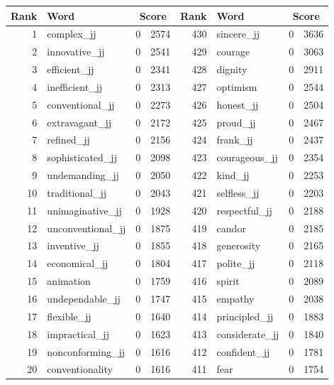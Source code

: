 \begin{table}[tbp]
    \begin{tabular}{| rlr@{.}l | rlr@{.}l |}
    \hline
    \textbf{Rank} & \textbf{Word} & \multicolumn{2}{c|}{\textbf{Score}} & \textbf{Rank} & \textbf{Word} & \multicolumn{2}{c|}{\textbf{Score}} \\
    \hline
    1 & complex\_jj & 0 & 2574    &    430 & sincere\_jj & 0 & 3636 \\
    2 & innovative\_jj & 0 & 2541    &    429 & courage & 0 & 3063 \\
    3 & efficient\_jj & 0 & 2341    &    428 & dignity & 0 & 2911 \\
    4 & inefficient\_jj & 0 & 2313    &    427 & optimism & 0 & 2544 \\
    5 & conventional\_jj & 0 & 2273    &    426 & honest\_jj & 0 & 2504 \\
    6 & extravagant\_jj & 0 & 2172    &    425 & proud\_jj & 0 & 2467 \\
    7 & refined\_jj & 0 & 2156    &    424 & frank\_jj & 0 & 2437 \\
    8 & sophisticated\_jj & 0 & 2098    &    423 & courageous\_jj & 0 & 2354 \\
    9 & undemanding\_jj & 0 & 2050    &    422 & kind\_jj & 0 & 2253 \\
    10 & traditional\_jj & 0 & 2043    &    421 & selfless\_jj & 0 & 2203 \\
    11 & unimaginative\_jj & 0 & 1928    &    420 & respectful\_jj & 0 & 2188 \\
    12 & unconventional\_jj & 0 & 1875    &    419 & candor & 0 & 2185 \\
    13 & inventive\_jj & 0 & 1855    &    418 & generosity & 0 & 2165 \\
    14 & economical\_jj & 0 & 1804    &    417 & polite\_jj & 0 & 2118 \\
    15 & animation & 0 & 1759    &    416 & spirit & 0 & 2089 \\
    16 & undependable\_jj & 0 & 1747    &    415 & empathy & 0 & 2038 \\
    17 & flexible\_jj & 0 & 1640    &    414 & principled\_jj & 0 & 1883 \\
    18 & impractical\_jj & 0 & 1623    &    413 & considerate\_jj & 0 & 1840 \\
    19 & nonconforming\_jj & 0 & 1616    &    412 & confident\_jj & 0 & 1781 \\
    20 & conventionality & 0 & 1616    &    411 & fear & 0 & 1754 \\

\end{tabular}
\end{table}

